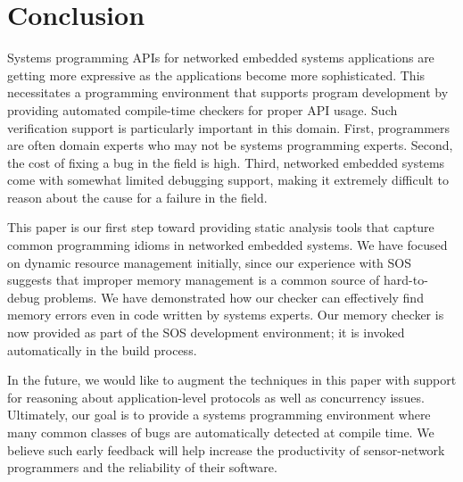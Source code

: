 \section{Conclusion}
\label{sec:conc}

Systems programming APIs for networked embedded systems applications 
are getting more expressive as the applications become more 
sophisticated. 
This necessitates a programming environment
that supports program development by providing 
automated compile-time checkers for proper API usage.
Such verification support is particularly important in this domain.
First, programmers are often domain experts who may not be systems
programming experts. Second, the cost of fixing a bug in the field
is high.
Third, networked embedded systems come with somewhat limited debugging
support, making it extremely difficult to reason about the cause for
a failure in the field.

This paper is our first step toward providing static analysis
tools that capture common programming idioms in networked embedded systems.
We have focused on dynamic resource management initially,
since our experience with SOS suggests that improper memory management
is a common source of hard-to-debug problems.
We have demonstrated how our checker can effectively find memory errors
even in code written by systems experts.
Our memory checker is now provided as part of the SOS development
environment; it is invoked automatically in the build process.

In the future, we would like to augment the techniques in this paper with
support for reasoning about
application-level protocols \cite{AlurPOPL05,HJM05} as well as
concurrency issues. 
Ultimately, our goal is to provide a systems programming environment 
where many common classes of bugs are automatically detected at
compile time.
We believe such early feedback will help increase the
productivity of sensor-network
programmers and the reliability of their software.



